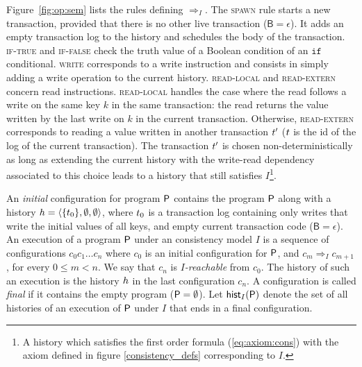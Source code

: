 Figure~\ref{fig:op:sem} lists the rules defining $\Rightarrow_I$. The \textsc{spawn} rule starts a new transaction, provided that there is no other live transaction ($\mathsf{B}=\epsilon$). It adds an empty transaction log to the history and schedules the body of the transaction. \textsc{if-true} and \textsc{if-false} check the truth value of a Boolean condition of an $\mathtt{if}$ conditional. \textsc{write} corresponds to a write instruction and consists in simply adding a write operation to the current history. \textsc{read-local} and \textsc{read-extern} concern read instructions. \textsc{read-local} handles the case where the read follows a write on the same key $k$ in the same transaction: the read returns the value written by the last write on $k$ in the current transaction. Otherwise, \textsc{read-extern} corresponds to reading a value written in another transaction $\tr'$ ($\tr$ is the id of the log of the current transaction). The transaction $\tr'$ is chosen non-deterministically as long as extending the current history with the write-read dependency associated to this choice leads to a history that still satisfies $I$\footnote{A history which satisfies the first order formula (\ref{eq:axiom:cons}) with the axiom defined in figure \ref{consistency_defs} corresponding to $I$.}.

An \emph{initial} configuration for program $\prog$ contains the program $\prog$ along with a history $\hist=\tup{\{\tr_0\},\emptyset,\emptyset}$, where $\tr_0$ is a transaction log containing only writes that write the initial values of all keys, and empty current transaction code ($\mathsf{B}=\epsilon$). 
An execution of a program $\prog$ under an consistency model $I$ is a sequence of configurations $c_0 c_1\ldots c_n$ where $c_0$ is an initial configuration for $\prog$, and $c_m\Rightarrow_I c_{m+1}$, for every $0\leq m < n$. We say that $c_n$ is \emph{$I$-reachable} from $c_0$.
The history of such an execution is the history $\hist$ in the last configuration $c_n$. 
A configuration is called \emph{final} if it contains the empty program ($\prog=\emptyset$).
Let $\histOf[I]{\prog}$ denote the set of all histories of an execution of $\prog$ under $I$ that ends in a final configuration.




%
%


